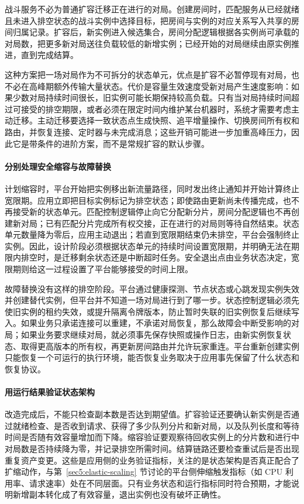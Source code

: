 战斗服务不必为普通扩容迁移正在进行的对局。创建房间时，匹配服务从已经就绪且未进入排空状态的战斗实例中选择目标，把房间与实例的对应关系写入共享的房间归属记录。扩容后，新实例进入候选集合，房间分配逻辑根据各实例尚可承载的对局数，把更多新对局送往负载较低的新增实例；已经开始的对局继续由原实例推进，直到完成结算。

这种方案把一场对局作为不可拆分的状态单元，优点是扩容不必暂停现有对局，也不必在高峰期额外传输大量状态。代价是容量生效速度受新对局产生速度影响：如果少数对局持续时间很长，旧实例可能长期保持较高负载。只有当对局持续时间超过可接受的排空期限，或者必须在限定时间内维护某台机器时，系统才需要考虑主动迁移。主动迁移要选择一致状态点生成快照、追平增量操作、切换房间所有权和路由，并恢复连接、定时器与未完成消息；这些开销可能进一步加重高峰压力，因此它是带条件的进阶方案，而不是常规扩容的默认步骤。

\paragraph{分别处理安全缩容与故障替换}

计划缩容时，平台开始把实例移出新流量路径，同时发出终止通知并开始计算终止宽限期。应用立即把目标实例标记为排空状态；即使路由更新尚未传播完成，也不再接受新的状态单元。匹配控制逻辑停止向它分配新分片，房间分配逻辑也不再创建新对局；已有匹配分片完成所有权交接，正在进行的对局则等待自然结束。状态单元数量降为零后，应用主动退出；若直到宽限期结束仍未排空，平台会强制终止实例。因此，设计阶段必须根据状态单元的持续时间设置宽限期，并明确无法在期限内排空时，是迁移剩余状态还是中断超时任务。安全退出点由业务状态决定，宽限期则给这一过程设置了平台能够接受的时间上限。

故障替换没有这样的排空阶段。平台通过健康探测、节点状态或心跳发现实例失效并创建替代实例，但平台并不知道一场对局进行到了哪一步。状态控制逻辑必须先使旧实例的租约失效，或提升隔离令牌版本，防止暂时失联的旧实例恢复后继续写入。如果业务只承诺连接可以重建，不承诺对局恢复，那么故障会中断受影响的对局；如果业务要求继续对局，就必须事先保存快照或操作日志，由新实例恢复状态、取得更高版本的所有权，再更新房间路由并允许玩家重连。平台重新创建实例只能恢复一个可运行的执行环境，能否恢复业务取决于应用事先保留了什么状态和恢复协议。

\paragraph{用运行结果验证状态架构}

改造完成后，不能只检查副本数是否达到期望值。扩容验证还要确认新实例是否通过就绪检查、是否收到请求、获得了多少队列分片和新对局，以及队列长度和等待时间是否随有效容量增加而下降。缩容验证要观察待回收实例上的分片数和进行中对局数是否持续降为零，并记录排空所需时间。结算链路还要检查重试后是否出现重复资产变更。这些是应用侧的业务验证指标，关注的是状态架构是否真正配合了扩缩动作，与第~\ref{sec5:elastic-scaling} 节讨论的平台侧伸缩触发指标（如 CPU 利用率、请求速率）处在不同层面。只有业务状态和运行指标同时符合预期，才能说明新增副本转化成了有效容量，退出实例也没有破坏正确性。

